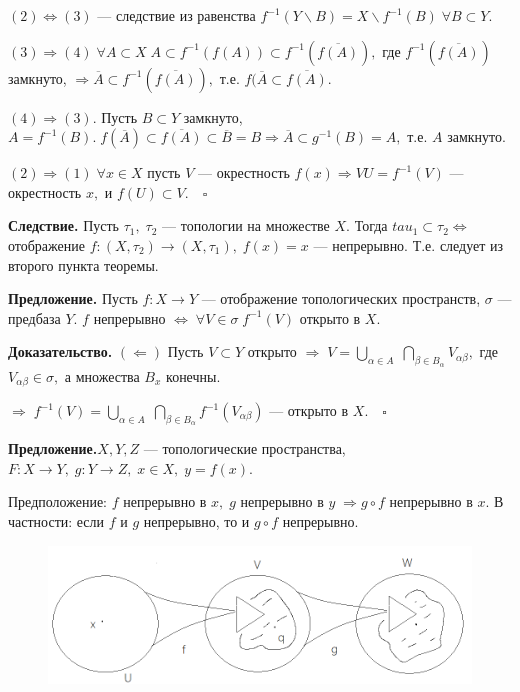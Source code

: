 \documentclass[12pt,a4paper]{article}
\begin{document}
$(2) \Leftrightarrow (3)$ --- следствие из равенства $f^{-1}(Y \backslash B) = X \backslash f^{-1}(B) \; \forall B \subset Y.$ 

$(3) \Rightarrow (4) \; \forall A \subset X \; A \subset f^{-1}(f(A)) \subset f^{-1}(\overline{f(A)}),$ где $f^{-1}(\overline{f(A)})$ замкнуто, $\Rightarrow \overline{A} \subset f^{-1}(\overline{f(A)}),$ т.е. $f(\overline{A} \subset \overline{f(A)}.$ 

$(4) \Rightarrow (3).$ Пусть $B \subset Y$ замкнуто, $A = f^{-1}(B). \; f(\overline{A}) \subset \overline{f(A)} \subset \overline{B} = B \Rightarrow \overline{A} \subset g^{-1}(B) = A,$ т.е. $A$ замкнуто. 

$(2) \Rightarrow (1) \; \forall x \in X$ пусть $V$ --- окрестность $f(x) \Rightarrow VU = f^{-1}(V)$ --- окрестность $x,$ и $f(U) \subset V. \quad \square$ 

\textbf{Следствие.} Пусть $\tau_{1}, \; \tau_{2}$ --- топологии на множестве $X.$ Тогда $tau_{1} \subset \tau_{2} \Leftrightarrow$ отображение $f: (X, \tau_{2}) \to (X, \tau_{1}), \; f(x) = x$ --- непрерывно. Т.е. следует из второго пункта теоремы. 

\textbf{Предложение.} Пусть $f: X \to Y$ --- отображение топологических пространств, $\sigma$ --- предбаза $Y.$ $f$ непрерывно $\Leftrightarrow \; \forall V \in \sigma \; f^{-1}(V)$ открыто в $X.$ 

\textbf{Доказательство.} $(\Leftarrow)$ Пусть $V \subset Y$ открыто $\Rightarrow \; V = \underset{\alpha \in A}{\bigcup} \; \underset{\beta \in B_{\alpha}}{\bigcap} V_{\alpha \beta},$ где $V_{\alpha\beta} \in \sigma,$ а множества $B_{x}$ конечны. 

$\Rightarrow \; f^{-1}(V) = \underset{\alpha \in A}{\bigcup} \; \underset{\beta \in B_{\alpha}}{\bigcap} f^{-1}(V_{\alpha \beta})$ --- открыто в $X. \quad \square$ 

\textbf{Предложение.}$X, Y, Z$ --- топологические пространства, $F: X \to Y, \; g: Y \to Z, \; x \in X, \; y = f(x).$ 

Предположение: $f$ непрерывно в $x, \; g$ непрерывно в $y \; \Rightarrow g \circ f$ непрерывно в $x.$ В частности: если $f$ и $g$ непрерывно, то и $g \circ f$ непрерывно. 

\begin{figure}[htpb]
	\centering
	\includegraphics[width=0.8\linewidth]{lect5_1.png}
\end{figure}
\end{document}

